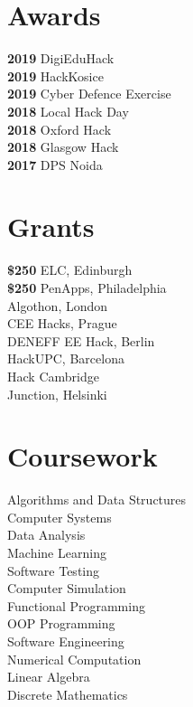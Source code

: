 \documentclass[]{deedy-resume-openfont}
\begin{document}
\begin{minipage}[t]{0.66\textwidth}
%
%


\end{minipage}%
\hfill
\begin{minipage}[t]{0.33\textwidth} 


\section{Awards} 

\textbf{2019 } DigiEduHack \\
\textbf{2019 } HackKosice \\
\textbf{2019 } Cyber Defence Exercise\\
\textbf{2018 } Local Hack Day\\
\textbf{2018 } Oxford Hack \\
\textbf{2018 } Glasgow Hack \\
\textbf{2017 } DPS Noida

\section{Grants}

\textbf{\$250 } ELC, Edinburgh \\
\textbf{\$250 } PenApps, Philadelphia \\
\textbf{ } Algothon, London \\
\textbf{ } CEE Hacks, Prague\\
\textbf{ } DENEFF EE Hack, Berlin\\
\textbf{ } HackUPC, Barcelona\\
\textbf{  } Hack Cambridge \\
\textbf{    } Junction, Helsinki


\section{Coursework}
Algorithms and Data Structures \\
Computer Systems \\
Data Analysis \\
Machine Learning \\
Software Testing \\
Computer Simulation \\
Functional Programming \\
OOP Programming \\
Software Engineering \\
Numerical Computation \\
Linear Algebra \\
Discrete Mathematics 


\end{minipage}
\end{document}
